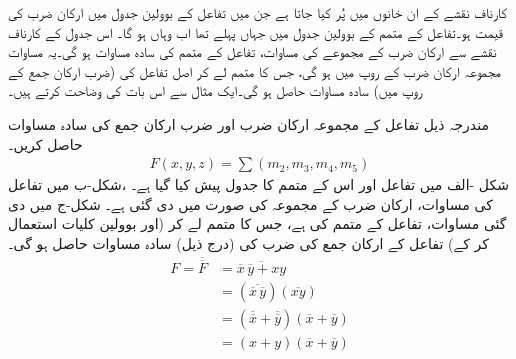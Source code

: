  کارناف نقشے   کے  ان خانوں  میں  پُر کیا جاتا ہے جن میں تفاعل کے بوولین جدول میں ارکان ضرب کی قیمت   ہو۔تفاعل کے     متمم کے بوولین جدول میں جہاں پہلے  تھا اب    وہاں    ہو گا۔ اس  جدول کے کارناف نقشے سے  ارکان ضرب کے مجموعے   کی  مساوات،  تفاعل کے  متمم  کی  سادہ  مساوات ہو گی۔یہ مساوات مجموعہ ارکان ضرب کے  روپ میں ہو گی،  جس کا  متمم  لے کر اصل تفاعل کی (ضرب ارکان جمع کے روپ میں) سادہ   مساوات حاصل  ہو گی۔ایک مثال سے اس بات کی  وضاحت کرتے   ہیں۔

مندرجہ ذیل تفاعل کے  مجموعہ ارکان ضرب اور ضرب ارکان جمع کی سادہ  مساوات حاصل کریں۔
\begin{align*}
F(x,y,z)=\sum(m_2,m_3,m_4,m_5)
\end{align*}
\quad
شکل -الف میں تفاعل اور اس کے متمم     کا جدول پیش کیا گیا ہے۔ ،شکل-ب میں تفاعل کی مساوات، ارکان ضرب کے مجموعہ کی  صورت میں دی گئی ہے۔ شکل-ج میں دی گئی مساوات،  تفاعل کے متمم   کی ہے، جس کا متمم لے کر (اور بوولین کلیات استعمال کر کے)   تفاعل کے ارکان جمع کی ضرب کی  (درج ذیل) سادہ   مساوات حاصل ہو گی۔
\begin{align*}
F=\overline{\overline{F}}&=\overline{\overline{x}\,\overline{y}+xy}\\
&=(\overline{\overline{x}\,\overline{y}})(\overline{xy})\\
&=(\overline{\overline{x}}+\overline{\overline{y}})(\overline{x}+\overline{y})\\
&=(x+y)(\overline{x}+\overline{y})
\end{align*}
%
